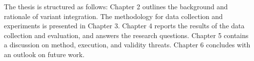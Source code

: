 The thesis is structured as follows: Chapter 2 outlines the background and rationale of variant integration. The methodology for data collection and experiments is presented in Chapter 3. Chapter 4 reports the results of the data collection and evaluation, and answers the research questions. Chapter 5 contains a discussion on method, execution, and validity threats. Chapter 6 concludes with an outlook on future work.


